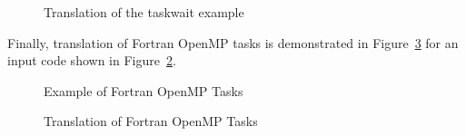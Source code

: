 \begin{figure}[htbp]
{\indent
  {\mySmallFontSize
    \begin{latexonly}
    
    \end{latexonly}
    \begin{htmlonly}
    
    \end{htmlonly}
  }
}
\caption{Translation of the taskwait example}
\label{Manual:omp:task_wait-trans}
\end{figure}

\clearpage
Finally, translation of Fortran OpenMP tasks
is demonstrated in
Figure~\ref{Manual:omp:task-trans-f} for an input code shown in
Figure~\ref{Manual:omp:task-f}. 

\lstset{language=Fortran,basicstyle=\scriptsize}
\lstset{language=Fortran,basicstyle=\scriptsize,numbers=left}
\begin{figure}[htbp]
{\indent
  {\mySmallFontSize
    \begin{latexonly}
    
    \end{latexonly}
    \begin{htmlonly}
    
    \end{htmlonly}
  }
}
\caption{Example of Fortran OpenMP Tasks}
\label{Manual:omp:task-f}
\end{figure}

\begin{figure}[htbp]
{\indent
  {\mySmallFontSize
    \begin{latexonly}
    
    \end{latexonly}
    \begin{htmlonly}
    
    \end{htmlonly}
  }
}
\caption{Translation of Fortran OpenMP Tasks}
\label{Manual:omp:task-trans-f}
\end{figure}

%

